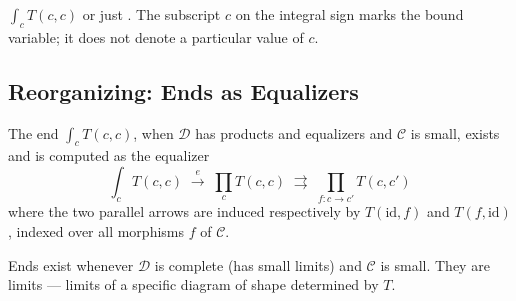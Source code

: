 \begin{howtosay}
$\int_c T(c, c)$  or just . The subscript $c$ on the integral sign marks the bound variable; it does
not denote a particular value of $c$.
\end{howtosay}

\subsection{Reorganizing: Ends as Equalizers}

\begin{theorem}
\label{thm:end-as-equalizer}
The end $\int_c T(c, c)$, when $\mathcal{D}$ has products and equalizers and
$\mathcal{C}$ is small, exists and is computed as the equalizer
\begin{equation*}
  \int_c T(c, c)
  \;\xrightarrow{e}\;
  \prod_c T(c, c)
  \;\rightrightarrows\;
  \prod_{f : c \to c'} T(c, c')
\end{equation*}
where the two parallel arrows are induced respectively by $T(\mathrm{id}, f)$
and $T(f, \mathrm{id})$, indexed over all morphisms $f$ of $\mathcal{C}$.
\end{theorem}

\begin{prooflog}
\end{prooflog}

\begin{corollary}
Ends exist whenever $\mathcal{D}$ is complete (has small limits) and
$\mathcal{C}$ is small. They are limits — limits of a specific diagram of
shape determined by $T$.
\end{corollary}

